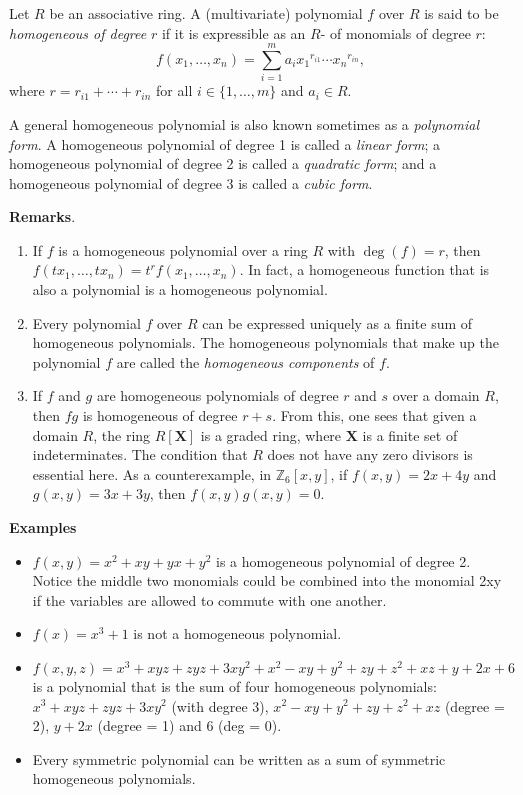 \documentclass[12pt]{article}
\begin{document}

Let $R$ be an associative ring.  A (multivariate) polynomial $f$ over $R$ is said to be \emph{homogeneous of degree} $r$ if it is expressible as an $R$- of monomials of degree $r$: 
$$f(x_1,\ldots,x_n)=\sum_{i=1}^{m}a_i{x_1}^{r_{i1}}\cdots{x_n}^{r_{in}},$$ 
where $r=r_{i1}+\cdots+r_{in}$ for all $i\in\lbrace 1,\ldots,m\rbrace$ and $a_i\in R$.  

A general homogeneous polynomial is also known sometimes as a \emph{polynomial form}.  A homogeneous polynomial of degree 1 is called a \emph{linear form}; a homogeneous polynomial of degree 2 is called a \emph{quadratic form}; and a homogeneous polynomial of degree 3 is called a \emph{cubic form}.

\textbf{Remarks}. 
\begin{enumerate} 
\item If $f$ is a homogeneous polynomial over a ring $R$ with $\operatorname{deg}(f)=r$, then $f(tx_1,\ldots,tx_n)=t^rf(x_1,\ldots,x_n)$.  In fact, a homogeneous function that is also a polynomial is a homogeneous polynomial.
\item Every polynomial $f$ over $R$ can be expressed uniquely as a finite sum of homogeneous polynomials.  
The homogeneous polynomials that make up the polynomial $f$ are called the \emph{homogeneous components} of $f$. 
\item If $f$ and $g$ are homogeneous polynomials of degree $r$ and $s$ over a domain $R$, then $fg$ is homogeneous of degree $r+s$.  From this, one sees that given a domain $R$, the ring $R[\boldsymbol{X}]$ is a graded ring, where $\boldsymbol{X}$ is a finite set of indeterminates.  The condition that $R$ does not have any zero divisors is essential here.  As a counterexample, in $\mathbb{Z}_6[x,y]$, if $f(x,y)=2x+4y$ and $g(x,y)=3x+3y$, then $f(x,y)g(x,y)=0$.
\end{enumerate} 

\textbf{Examples} 
\begin{itemize} 
\item $f(x,y) = x^2+xy+yx+y^2$ is a homogeneous polynomial of degree 2.  Notice the middle two monomials could be combined into the monomial 2xy if the variables are allowed to commute with one another.
\item $f(x) = x^3+1$ is not a homogeneous polynomial. 
\item $f(x,y,z) = x^3+xyz+zyz+3xy^2+x^2-xy+y^2+zy+z^2+xz+y+2x+6$ is a polynomial that is the sum of four homogeneous 
polynomials: $x^3+xyz+zyz+3xy^2$ (with degree 3), $x^2-xy+y^2+zy+z^2+xz$ (degree = 2), $y+2x$ (degree = 1) and 
$6$ (deg = 0). 
\item Every symmetric polynomial can be written as a sum of symmetric homogeneous polynomials.
\end{itemize}
\end{document}
